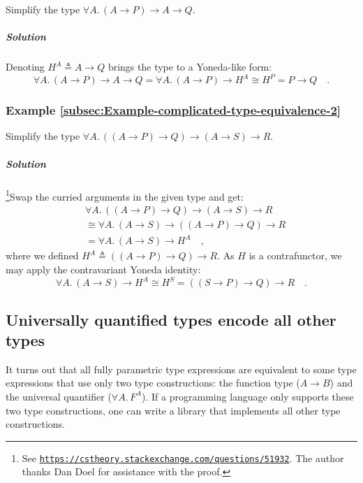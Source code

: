 Simplify the type $\forall A.\,(A\rightarrow P)\rightarrow A\rightarrow Q$.

\subparagraph{Solution}

Denoting $H^{A}\triangleq A\rightarrow Q$ brings the type to a Yoneda-like
form:
\[
\forall A.\,(A\rightarrow P)\rightarrow A\rightarrow Q=\forall A.\,(A\rightarrow P)\rightarrow H^{A}\cong H^{P}=P\rightarrow Q\quad.
\]
 

\subsubsection{Example \label{subsec:Example-complicated-type-equivalence-2}\ref{subsec:Example-complicated-type-equivalence-2}}

Simplify the type $\forall A.\,((A\rightarrow P)\rightarrow Q)\rightarrow(A\rightarrow S)\rightarrow R$.

\subparagraph{Solution}

\footnote{See \texttt{\href{https://cstheory.stackexchange.com/questions/51932}{https://cstheory.stackexchange.com/questions/51932}}.
The author thanks Dan Doel for assistance with the
proof.}Swap the curried arguments in the given type and get:
\begin{align*}
 & \forall A.\,((A\rightarrow P)\rightarrow Q)\rightarrow(A\rightarrow S)\rightarrow R\\
 & \cong\forall A.\,(A\rightarrow S)\rightarrow((A\rightarrow P)\rightarrow Q)\rightarrow R\\
 & =\forall A.\,(A\rightarrow S)\rightarrow H^{A}\quad,
\end{align*}
where we defined $H^{A}\triangleq((A\rightarrow P)\rightarrow Q)\rightarrow R$.
As $H$ is a contrafunctor, we may apply the contravariant Yoneda
identity:
\[
\forall A.\,(A\rightarrow S)\rightarrow H^{A}\cong H^{S}=((S\rightarrow P)\rightarrow Q)\rightarrow R\quad.
\]


\subsection{Universally quantified types encode all other types}

It turns out that all fully parametric type expressions are equivalent
to some type expressions that use only two type constructions: the
function type ($A\rightarrow B$) and the universal quantifier ($\forall A.\,F^{A}$).
If a programming language only supports these two type constructions,
one can write a library that implements all other type constructions.

